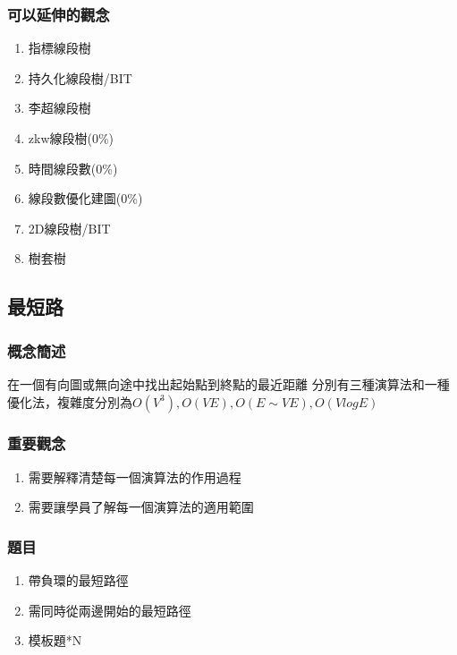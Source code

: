 \documentclass[12pt,oneside]{article}
\begin{document}
\subsubsection*{可以延伸的觀念}
\begin{adjustwidth}{2em}{0em}
\begin{enumerate}
    \item 指標線段樹
    \item 持久化線段樹/BIT
    \item 李超線段樹
    \item zkw線段樹(0\%)
    \item 時間線段數(0\%)
    \item 線段數優化建圖(0\%)
    \item 2D線段樹/BIT
    \item 樹套樹
\end{enumerate}
\end{adjustwidth}


\clearpage


\subsection{最短路}

\subsubsection*{概念簡述}
在一個有向圖或無向途中找出起始點到終點的最近距離
分別有三種演算法和一種優化法，複雜度分別為$O(V^3), O(VE), O(E\sim VE), O(VlogE)$

\subsubsection*{重要觀念}
\begin{adjustwidth}{2em}{0em}
\begin{enumerate}
    \item 需要解釋清楚每一個演算法的作用過程
    \item 需要讓學員了解每一個演算法的適用範圍
\end{enumerate}
\end{adjustwidth}

\subsubsection*{題目}
\begin{adjustwidth}{2em}{0em}
\begin{enumerate}
    \item 帶負環的最短路徑
    \item 需同時從兩邊開始的最短路徑
    \item 模板題*N
\end{enumerate}
\end{adjustwidth}
\end{document}
